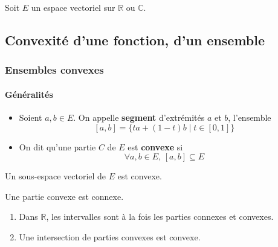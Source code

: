 




  Soit $E$ un espace vectoriel sur $\mathbb{R}$ ou $\mathbb{C}$.

  \subsection{Convexité d'une fonction, d'un ensemble}

  \subsubsection{Ensembles convexes}

  \paragraph{Généralités}


  \begin{definition}
    \begin{itemize}
      \item Soient $a, b \in E$. On appelle \textbf{segment} d'extrémités $a$ et $b$, l'ensemble
      \[ [a,b] = \{ ta + (1-t)b \mid t \in [0,1] \} \]
      \item On dit qu'une partie $C$ de $E$ est \textbf{convexe} si
      \[ \forall a, b \in E, \, [a,b] \subseteq E \]
    \end{itemize}
  \end{definition}

  \begin{example}
    Un sous-espace vectoriel de $E$ est convexe.
  \end{example}

  \begin{remark}
    Une partie convexe est connexe.
  \end{remark}


  \begin{proposition}
    \begin{enumerate}[label={\bfseries(\roman*)}]
      \item Dans $\mathbb{R}$, les intervalles sont à la fois les parties connexes et convexes.
      \item Une intersection de parties convexes est convexe.
    \end{enumerate}
  \end{proposition}

